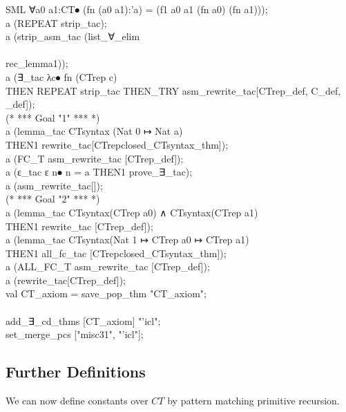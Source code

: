 {\begin{GFT}{SML}
\+           ∀a0 a1:CT⦁ (fn (a0  a1):'a) = (f1 a0 a1 (fn a0) (fn a1))\PrKO{});\\
\+a (REPEAT strip\_tac);\\
\+a (strip\_asm\_tac (list\_∀\_elim\\
\+	[\PrKM{}λc:ONE GSU⦁ f0 (εn⦁ Nat\PrIJ{u} n = c)\PrKO{},\\
\+	\PrKM{}λa0 a1 fa0 fa1⦁ f1 (CTabs a0) (CTabs a1) fa0 fa1\PrKO{}]\\
\+ rec\_lemma1));\\
\+a (∃\_tac \PrKM{}λc⦁ fn (CTrep c)\PrKO{}\\
\+	THEN REPEAT strip\_tac THEN\_TRY asm\_rewrite\_tac[CTrep\_def, C\_def, \_def]);\\
\+(* *** Goal "1" *** *)\\
\+a (lemma\_tac \PrKM{}CTsyntax (Nat 0 ↦ Nat a)\PrKO{}\\
\+	THEN1 rewrite\_tac[CTrepclosed\_CTsyntax\_thm]);\\
\+a (FC\_T asm\_rewrite\_tac [CTrep\_def]);\\
\+a (ε\_tac \PrKM{}ε n⦁ n = a\PrKO{} THEN1 prove\_∃\_tac);\\
\+a (asm\_rewrite\_tac[]);\\
\+(* *** Goal "2" *** *)\\
\+a (lemma\_tac \PrKM{}CTsyntax(CTrep a0) ∧ CTsyntax(CTrep a1)\PrKO{}\\
\+	THEN1 rewrite\_tac [CTrep\_def]);\\
\+a (lemma\_tac \PrKM{}CTsyntax(Nat 1 ↦ CTrep a0 ↦ CTrep a1)\PrKO{}\\
\+	THEN1 all\_fc\_tac [CTrepclosed\_CTsyntax\_thm]);\\
\+a (ALL\_FC\_T asm\_rewrite\_tac [CTrep\_def]);\\
\+a (rewrite\_tac[CTrep\_def]);\\
\+val CT\_axiom = save\_pop\_thm "CT\_axiom";\\
\+\\
\+add\_∃\_cd\_thms [CT\_axiom] "'icl";\\
\+set\_merge\_pcs ["misc31", "'icl"];\\
\end{GFT}
}%

\subsection{Further Definitions}

We can now define constants over $CT$ by pattern matching primitive recursion.

